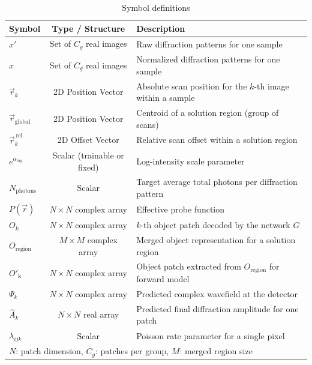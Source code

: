\documentclass{optica-article}
\begin{document}
\begin{table}[h]
\renewcommand{\arraystretch}{1.2}
\centering
\caption{Symbol definitions}
\label{tab:symbols}
\begin{tabular}{lcl}
\hline
\textbf{Symbol} & \textbf{Type / Structure} & \textbf{Description} \\
\hline
$x'$ & Set of $C_g$ real images & Raw diffraction patterns for one sample \\
$x$ & Set of $C_g$ real images & Normalized diffraction patterns for one sample \\
$\vec{r}_k$ & 2D Position Vector & Absolute scan position for the $k$-th image within a sample \\
$\vec{r}_{\text{global}}$ & 2D Position Vector & Centroid of a solution region (group of scans) \\
$\vec{r}^{\,\text{rel}}_k$ & 2D Offset Vector & Relative scan offset within a solution region \\
$e^{\alpha_{\log}}$ & Scalar (trainable or fixed) & Log-intensity scale parameter \\
$N_{\text{photons}}$ & Scalar & Target average total photons per diffraction pattern \\
$P(\vec{r})$ & $N \times N$ complex array & Effective probe function \\
$O_k$ & $N \times N$ complex array & $k$-th object patch decoded by the network $G$ \\
$O_{\text{region}}$ & $M \times M$ complex array & Merged object representation for a solution region \\
$O'_{\text{k}}$ & $N \times N$ complex array & Object patch extracted from $O_{\text{region}}$ for forward model \\
$\Psi_k$ & $N \times N$ complex array & Predicted complex wavefield at the detector \\
$\hat{A}_k$ & $N \times N$ real array & Predicted final diffraction amplitude for one patch \\
$\lambda_{ijk}$ & Scalar & Poisson rate parameter for a single pixel \\
\hline
\multicolumn{3}{l}{\footnotesize $N$: patch dimension, $C_g$: patches per group, $M$: merged region size}
\end{tabular}
\end{table}
\end{document}
